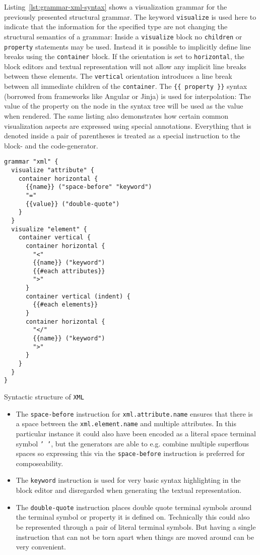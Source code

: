 \documentclass[sigconf,natbib=false,review=true,anonymous]{acmart}
\begin{document}
Listing~\ref{lst:grammar-xml-syntax} shows a visualization grammar for the previously presented structural grammar. The keyword \texttt{visualize} is used here to indicate that the information for the specified type are not changing the structural semantics of a grammar: Inside a \texttt{visualize} block no \texttt{children} or \texttt{property} statements may be used. Instead it is possible to implicitly define line breaks using the \texttt{container} block. If the orientation is set to \texttt{horizontal}, the block editors and textual representation will not allow any implicit line breaks between these elements. The \texttt{vertical} orientation introduces a line break between all immediate children of the \texttt{container}. The \texttt{\{\{ property \}\}} syntax (borrowed from frameworks like Angular or Jinja) is used for interpolation: The value of the property on the node in the syntax tree will be used as the value when rendered. The same listing also demonstrates how certain common visualization aspects are expressed using special annotations. Everything that is denoted inside a pair of parentheses is treated as a special instruction to the block- and the code-generator.

\begin{listing}[H]
\begin{verbatim}
grammar "xml" {
  visualize "attribute" {
    container horizontal {
      {{name}} ("space-before" "keyword")
      "="
      {{value}} ("double-quote")
    }
  }
  visualize "element" {
    container vertical {
      container horizontal {
        "<"
        {{name}} ("keyword")
        {{#each attributes}}
        ">"
      }
      container vertical (indent) {
        {{#each elements}}
      }
      container horizontal {
        "</"
        {{name}} ("keyword")
        ">"
      }
    }
  }
}
\end{verbatim}
\caption{Syntactic structure of \texttt{XML}}
\label{lst:grammar-xml-syntax}
\end{listing}

\begin{itemize}
\item The \texttt{space-before} instruction for \texttt{xml.attribute.name} ensures that there is a space between the \texttt{xml.element.name} and multiple attributes. In this particular instance it could also have been encoded as a literal space terminal symbol \texttt{'~'}, but the generators are able to e.g. combine multiple superflous spaces so expressing this via the \texttt{space-before} instruction is preferred for composeability.
\item The \texttt{keyword} instruction is used for very basic syntax highlighting in the block editor and disregarded when generating the textual representation.
\item The \texttt{double-quote} instruction places double quote terminal symbols around the terminal symbol or property it is defined on. Technically this could also be represented through a pair of literal terminal symbols. But having a single instruction that can not be torn apart when things are moved around can be very convenient.
\end{itemize}
\end{document}
